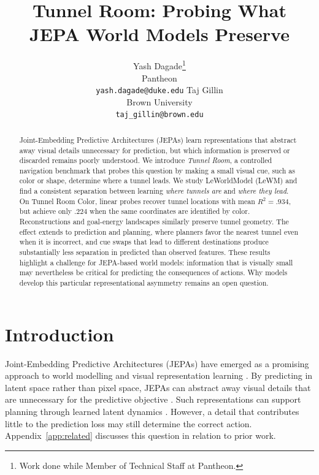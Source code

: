 \documentclass{article}
\title{Tunnel Room: Probing What JEPA World Models Preserve}
\author{
  Yash Dagade\thanks{Work done while Member of Technical Staff at Pantheon.} \\
  Pantheon \\
  \texttt{yash.dagade@duke.edu}
  \And
  Taj Gillin \\
  Brown University \\
  \texttt{taj\_gillin@brown.edu}
}
\begin{document}
\maketitle

\begin{abstract}
Joint-Embedding Predictive Architectures (JEPAs) learn representations that
abstract away visual details unnecessary for prediction, but which information
is preserved or discarded remains poorly understood. We introduce
\emph{Tunnel Room}, a controlled navigation benchmark that probes this question
by making a small visual cue, such as color or shape, determine where a tunnel
leads. We study LeWorldModel (LeWM) and find a consistent separation between
learning \emph{where tunnels are} and \emph{where they lead}. On Tunnel Room
Color, linear probes recover tunnel locations with mean $R^2=.934$, but achieve
only $.224$ when the same coordinates are identified by color. Reconstructions and goal-energy
landscapes similarly preserve tunnel geometry. The effect extends to prediction and planning, where planners favor the nearest
tunnel even when it is incorrect, and cue swaps that lead to different
destinations produce substantially less separation in predicted than observed
features. These results highlight a challenge for JEPA-based world models:
information that is visually small may nevertheless be critical for predicting
the consequences of actions. Why models develop this particular representational
asymmetry remains an open question.
\end{abstract}

\section{Introduction}
\label{sec:introduction}

Joint-Embedding Predictive Architectures (JEPAs) have emerged as a promising approach to world modelling and visual representation learning
\citep{assran2023ijepa,bardes2024vjepa,assran2025vjepa2,murlabadia2026vjepa21,maes2026stableworldmodel}.
By predicting in latent space rather than pixel space, JEPAs can abstract away visual details that are unnecessary for the predictive objective
\citep{lecun2022path,balestriero2025lejepa}.
Such representations can support planning through learned latent dynamics
\citep{sobal2025latentplanning,maes2026leworldmodel}. However, a detail that contributes little to the prediction loss may still determine the correct action. Appendix~\ref{app:related} discusses this question in relation to prior work.
\end{document}
